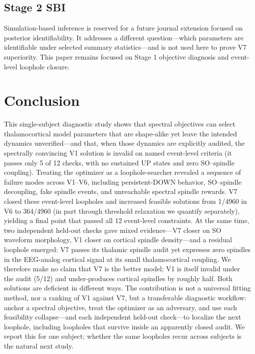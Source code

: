 \documentclass[conference]{IEEEtran}
\begin{document}
\subsection{Stage 2 SBI}
Simulation-based inference is reserved for a future journal extension focused on
posterior identifiability. It addresses a different question---which parameters
are identifiable under selected summary statistics---and is not used here to
prove V7 superiority. This paper remains focused on Stage 1 objective diagnosis
and event-level loophole closure.

\section{Conclusion}
This single-subject diagnostic study shows that spectral objectives can select
thalamocortical model parameters that are shape-alike yet leave the intended
dynamics unverified---and that, when those dynamics are explicitly audited, the
spectrally convincing V1 solution is invalid on named event-level criteria (it
passes only 5 of 12 checks, with no sustained UP states and zero SO--spindle
coupling). Treating the optimizer as a loophole-searcher revealed a sequence of
failure modes across V1--V6, including persistent-DOWN behavior, SO--spindle
decoupling, fake spindle events, and unreachable spectral spindle rewards. V7
closed these event-level loopholes and increased feasible solutions from 1/4960
in V6 to 364/4960 (in part through threshold relaxation we quantify separately),
yielding a final point that passed all 12 event-level constraints. At the same
time, two independent held-out checks gave mixed evidence---V7 closer on SO
waveform morphology, V1 closer on cortical spindle density---and a residual
loophole emerged: V7 passes its thalamic spindle audit yet expresses zero
spindles in the EEG-analog cortical signal at its small thalamocortical
coupling. We therefore make no claim that V7 is the better model; V1 is itself
invalid under the audit (5/12) and under-produces cortical spindles by roughly
half. Both solutions are deficient in different ways. The contribution is not a
universal fitting method, nor a ranking of V1 against V7, but a transferable
diagnostic workflow: anchor a spectral objective, treat the optimizer as an
adversary, and use each feasibility collapse---and each independent held-out
check---to localize the next loophole, including loopholes that survive inside
an apparently closed audit. We report this for one subject; whether the same
loopholes recur across subjects is the natural next study.
\end{document}
